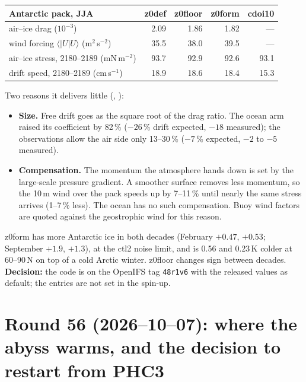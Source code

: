 \documentclass[10pt]{article}
\begin{document}
\begin{center}\small
\begin{tabular}{lrrrr}
\toprule
Antarctic pack, JJA & z0def & z0floor & z0form & cdoi10 \\
\midrule
air--ice drag ($10^{-3}$) & 2.09 & 1.86 & 1.82 & --- \\
wind forcing $\langle|U|U\rangle$ (m$^2$\,s$^{-2}$) & 35.5 & 38.0 & 39.5 & --- \\
air--ice stress, 2180--2189 (mN\,m$^{-2}$) & 93.7 & 92.9 & 92.6 & 93.1 \\
drift speed, 2180--2189 (cm\,s$^{-1}$) & 18.9 & 18.6 & 18.4 & 15.3 \\
\bottomrule
\end{tabular}
\end{center}

Two reasons it delivers little (,
):

\begin{itemize}\itemsep2pt
\item \textbf{Size.} Free drift goes as the square root of the drag ratio. The ocean arm raised its
coefficient by 82\,\% ($-26$\,\% drift expected, $-18$ measured); the observations allow the air side
only 13--30\,\% ($-7$\,\% expected, $-2$ to $-5$ measured).
\item \textbf{Compensation.} The momentum the atmosphere hands down is set by the large-scale pressure
gradient. A smoother surface removes less momentum, so the 10\,m wind over the pack speeds up by
7--11\,\% until nearly the same stress arrives (1--7\,\% less). The ocean has no such compensation.
Buoy wind factors are quoted against the geostrophic wind for this reason.
\end{itemize}

z0form has more Antarctic ice in both decades (February $+0.47$, $+0.53$; September $+1.9$, $+1.3$), at
the ctl2 noise limit, and is 0.56 and 0.23\,K colder at 60--90\,N on top of a cold Arctic winter. z0floor
changes sign between decades. \textbf{Decision:} the code is on the OpenIFS tag \texttt{48r1v6} with the
released values as default; the entries are not set in the spin-up.

\section{Round 56 (2026--10--07): where the abyss warms, and the decision to restart from PHC3}\label{sec:round56}
\end{document}

